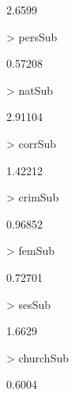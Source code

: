 \documentclass[12pt]{article}
\begin{document}
\begin{enumerate}
\begin{Schunk}
\begin{Soutput}
[1] 2.6599
\end{Soutput}
\begin{Sinput}
> persSub
\end{Sinput}
\begin{Soutput}
[1] 0.57208
\end{Soutput}
\begin{Sinput}
> natSub
\end{Sinput}
\begin{Soutput}
[1] 2.91104
\end{Soutput}
\begin{Sinput}
> corrSub
\end{Sinput}
\begin{Soutput}
[1] 1.42212
\end{Soutput}
\begin{Sinput}
> crimSub
\end{Sinput}
\begin{Soutput}
[1] 0.96852
\end{Soutput}
\begin{Sinput}
> femSub
\end{Sinput}
\begin{Soutput}
[1] 0.72701
\end{Soutput}
\begin{Sinput}
> sesSub
\end{Sinput}
\begin{Soutput}
[1] 1.6629
\end{Soutput}
\begin{Sinput}
> churchSub
\end{Sinput}
\begin{Soutput}
[1] 0.6004
\end{Soutput}
\end{Schunk}

\end{enumerate}
\end{document}
